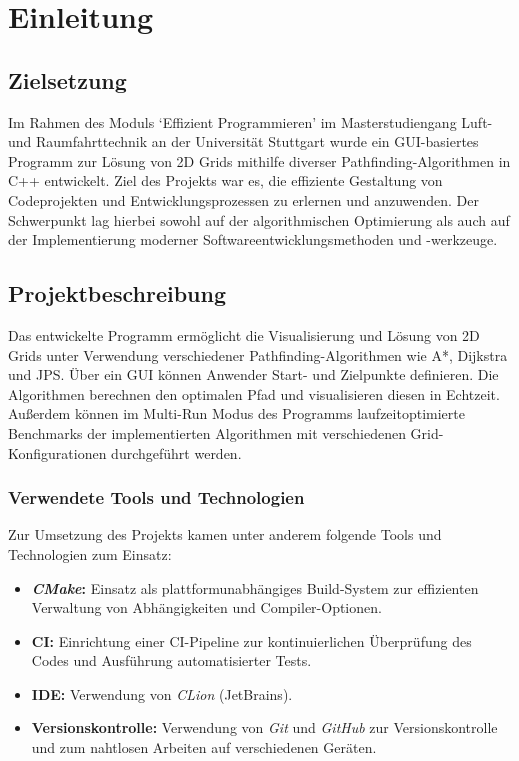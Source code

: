 \chapter{Einleitung}
\label{ch:einleitung}

\section{Zielsetzung}
\label{sec:motivation}
Im Rahmen des Moduls `Effizient Programmieren' im Masterstudiengang Luft- und Raumfahrttechnik an der Universität Stuttgart
wurde ein GUI-basiertes Programm zur Lösung von 2D Grids mithilfe diverser Pathfinding-Algorithmen in C++ entwickelt.
Ziel des Projekts war es, die effiziente Gestaltung von Codeprojekten und Entwicklungsprozessen zu erlernen und anzuwenden.
Der Schwerpunkt lag hierbei sowohl auf der algorithmischen Optimierung als auch auf der Implementierung moderner Softwareentwicklungsmethoden und -werkzeuge.

\section{Projektbeschreibung}
\label{sec:beschreibung}
Das entwickelte Programm ermöglicht die Visualisierung und Lösung von 2D Grids unter Verwendung verschiedener Pathfinding-Algorithmen wie A*, Dijkstra und \ac{JPS}.
Über ein \ac{GUI} können Anwender Start- und Zielpunkte definieren.
Die Algorithmen berechnen den optimalen Pfad und visualisieren diesen in Echtzeit.
Außerdem können im Multi-Run Modus des Programms laufzeitoptimierte Benchmarks der implementierten Algorithmen mit verschiedenen Grid-Konfigurationen durchgeführt werden.
\subsection*{Verwendete Tools und Technologien}
Zur Umsetzung des Projekts kamen unter anderem folgende Tools und Technologien zum Einsatz:
\begin{itemize}
\item \textbf{\textit{CMake}:} Einsatz als plattformunabhängiges Build-System zur effizienten Verwaltung von Abhängigkeiten und Compiler-Optionen.
\item \textbf{\ac{CI}:} Einrichtung einer CI-Pipeline zur kontinuierlichen Überprüfung des Codes und Ausführung automatisierter Tests.
\item \textbf{\ac{IDE}:} Verwendung von \textit{CLion} (JetBrains).
\item \textbf{Versionskontrolle:} Verwendung von \textit{Git} und \textit{GitHub} zur Versionskontrolle und zum nahtlosen Arbeiten auf verschiedenen Geräten.
\end{itemize}

